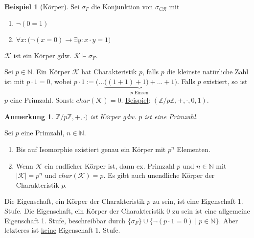 \documentclass{article}
\theoremstyle{definition}
\newtheorem*{bsp}{Beispiel}
\theoremstyle{plain}
\newtheorem*{anm}{Anmerkung}
\newcommand{\m}[1]{\mathcal{#1}}
\begin{document}
    \begin{bsp}[Körper]
        Sei $ \sigma_F $ die Konjunktion von $ \sigma_{C\m{R}} $ mit
        \begin{enumerate}
            \item $ \neg(0 = 1) $
            \item $ \forall x: \big( \neg( x = 0 ) \rightarrow \exists y: x \cdot y = 1 \big) $
        \end{enumerate}
        $ \m{K} $ ist ein Körper gdw. $ \m{K} \models \sigma_F $.

        Sei $ p \in \mathbb{N} $.
        Ein Körper $ \m{K} $ hat Charakteristik $ p $, falls $ p $ die kleinste natürliche Zahl ist mit $ p \cdot 1 = 0 $, wobei $ p \cdot 1 := \Big( ... \underbrace{\big((1 + 1) + 1 \big) + ... + 1}_{p \text{ Einsen}} \Big) $.
        Falls $ p $ existiert, so ist $ p $ eine Primzahl.
        Sonst: $ char(\m{K}) = 0 $.
        \underline{Beispiel}: $ (\mathbb{Z}/p\mathbb{Z}, +, \cdot, 0, 1) $.

        \begin{anm}
            $ \mathbb{Z}/p\mathbb{Z}, +, \cdot ) $ ist Körper gdw. $ p $ ist eine Primzahl.
        \end{anm}

        Sei $ p $ eine Primzahl, $ n \in \mathbb{N} $.
        \begin{enumerate}%
            \item Bis auf Isomorphie existiert genau ein Körper mit $ p^n $ Elementen.
            \item Wenn $ \m{K} $ ein endlicher Körper ist, dann ex. Primzahl $ p $ und $ n \in \mathbb{N} $ mit $ | \m{K} | = p^n $ und $ char(\m{K}) = p $.
            Es gibt auch unendliche Körper der Charakteristik $ p $.
        \end{enumerate}
        Die Eigenschaft, ein Körper der Charakteristik $ p $ zu sein, ist eine Eigenschaft 1. Stufe.
        Die Eigenschaft, ein Körper der Charakteristik  0 zu sein ist eine allgemeine Eigenschaft 1. Stufe, beschreibbar durch $ \{ \sigma_F \} \cup \big\{ \neg (p \cdot 1 = 0) \mid p \in \mathbb{N} \big\} $.
        Aber letzteres ist \underline{keine} Eigenschaft 1. Stufe.
    \end{bsp}
\end{document}
